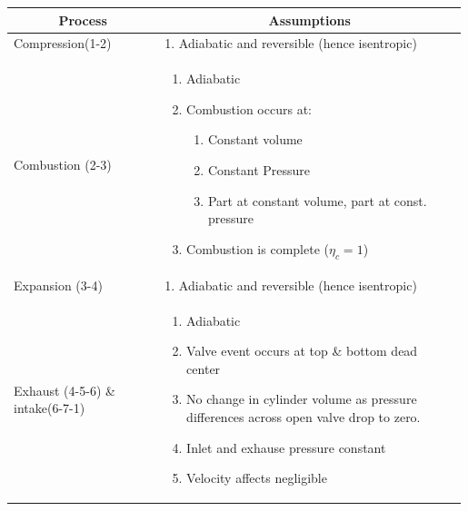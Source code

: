 \documentclass{article}
\begin{document}
\begin{table}[htbp]
	\centering
	\begin{tabularx}{\linewidth}{ p{0.33\linewidth} p{0.66\linewidth}}
	  \hline
	  \multicolumn{1}{c}{Process} & \multicolumn{1}{c}{Assumptions} \\
	  \hline
	  Compression(1-2) & 1. Adiabatic and reversible (hence isentropic) \\
	  \hline
	  Combustion (2-3) & \begin{enumerate}
			\item Adiabatic 
			\item Combustion occurs at: 
				\begin{enumerate}
					\item Constant volume 
					\item Constant Pressure 
					\item Part at constant volume, part at const. pressure 
				\end{enumerate}
			\item Combustion is complete ($\eta_c = 1$)
		\end{enumerate}
	  \\
	  \hline
	  Expansion (3-4) & 1. Adiabatic and reversible (hence isentropic)\\
	  \hline 
		Exhaust (4-5-6) \& intake(6-7-1) & 
			\begin{enumerate}
				\item Adiabatic 
				\item Valve event occurs at top \& bottom dead center 
				\item No change in cylinder volume as pressure differences across open valve drop to zero. 
				\item Inlet and exhause pressure constant 
				\item Velocity affects negligible  
			\end{enumerate}
		\\
		
		\hline 

	\end{tabularx}
  \end{table}
\end{document}
